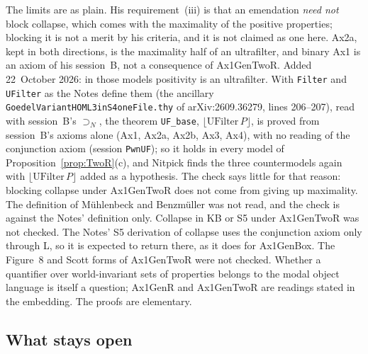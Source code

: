 \documentclass[11pt,a4paper]{article}
\newcommand{\valid}[1]{\lfloor #1 \rfloor}
\newcommand{\necImp}{\supset_{N}}
\newcommand{\lean}[1]{\texttt{#1}}
\theoremstyle{definition}
\theoremstyle{remark}
\begin{document}
The limits are as plain.
His requirement~(iii) is that an emendation \emph{need not} block collapse,
which comes with the maximality of the positive properties; blocking it is
not a merit by his criteria, and it is not claimed as one here.
Ax2a, kept in both directions, is the maximality half of an ultrafilter, and
binary Ax1 is an axiom of his session~B, not a consequence of Ax1GenTwoR.
Added 22~October 2026: in those models positivity is an ultrafilter.
With \lean{Filter} and \lean{UFilter} as the Notes define them (the
ancillary \lean{GoedelVariantHOML3inS4oneFile.thy} of
arXiv:2609.36279, lines 206--207), read with session~B's
\(\necImp\), the theorem \lean{UF\_base}, \(\valid{\mathrm{UFilter}\,P}\),
is proved from session~B's axioms alone (Ax1, Ax2a, Ax2b, Ax3, Ax4), with no
reading of the conjunction axiom (session \lean{PwnUF}); so it holds in
every model of Proposition~\ref{prop:TwoR}(c), and Nitpick finds the three
countermodels again with \(\valid{\mathrm{UFilter}\,P}\) added as a
hypothesis.
The check says little for that reason: blocking collapse under Ax1GenTwoR
does not come from giving up maximality.
The definition of M\"uhlenbeck and Benzm\"uller
\cite{muehlenbeckBenzmueller2026} was not read, and the check is against the
Notes' definition only.
Collapse in KB or S5 under Ax1GenTwoR was not checked.
The Notes' S5 derivation of collapse uses the conjunction axiom only through
L, so it is expected to return there, as it does for Ax1GenBox.
The Figure~8 and Scott forms of Ax1GenTwoR were not checked.
Whether a quantifier over world-invariant sets of properties belongs to the
modal object language is itself a question; Ax1GenR and Ax1GenTwoR are
readings stated in the embedding.
The proofs are elementary.

\subsection{What stays open}
\end{document}
